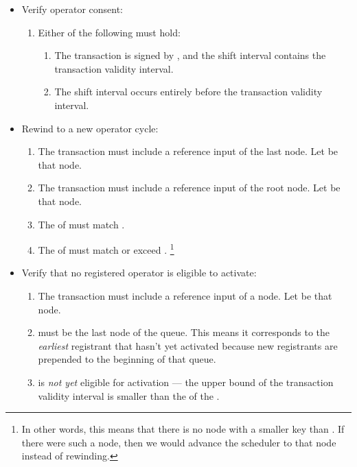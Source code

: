 \documentclass[../midgard.tex]{subfiles}
\begin{document}
\begin{description}
\begin{itemize}
            \item Verify operator consent:
            \begin{enumerate}[resume]
                \item Either of the following must hold:
                \begin{enumerate}
                    \item The transaction is signed by , and the  shift interval contains the transaction validity interval.
                    \item The  shift interval occurs entirely before the transaction validity interval.
                \end{enumerate}
            \end{enumerate}
            
            \item Rewind to a new operator cycle:
            \begin{enumerate}[resume]
                \item The transaction must include a reference input of the last  node.
                  Let  be that node.
                \item The transaction must include a reference input of the root  node.
                  Let  be that node.
                \item The  of  must match .
                \item The  of  must match or exceed .%
                \footnote{In other words, this means that there is no  node with a smaller key than .
                  If there were such a node, then we would advance the scheduler to that node instead of rewinding.}
            \end{enumerate}
            
            \item Verify that no registered operator is eligible to activate:
            \begin{enumerate}[resume]
                \item The transaction must include a reference input of a  node.
                  Let  be that node.
                \item {} must be the last node of the  queue.
                  This means it corresponds to the \emph{earliest} registrant that hasn't yet activated because new registrants are prepended to the beginning of that queue.
                \item {} is \emph{not yet} eligible for activation --- the upper bound of the transaction validity interval is smaller than the  of the .
            \end{enumerate}
        \end{itemize}
\end{description}
\end{document}

